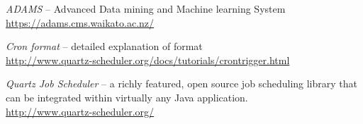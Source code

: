 %

\begin{thebibliography}{999}

		\textit{ADAMS} -- Advanced Data mining and Machine learning System \\
		\url{https://adams.cms.waikato.ac.nz/}{}
		
		\textit{Cron format} -- detailed explanation of format \\
		\url{http://www.quartz-scheduler.org/docs/tutorials/crontrigger.html}{}

		\textit{Quartz Job Scheduler} -- a richly featured, open source
		job scheduling library that can be integrated within virtually
		any Java application. \\
		\url{http://www.quartz-scheduler.org/}{}

\end{thebibliography}

